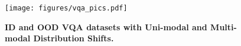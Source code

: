 \begin{figure}[!h]
     \centering
     \texttt{[image: figures/vqa\_pics.pdf]}
     \caption{\textbf{ID and OOD VQA datasets with Uni-modal and Multi-modal Distribution Shifts.} 
     }
     \label{fig:vqa_datasets}
\end{figure}